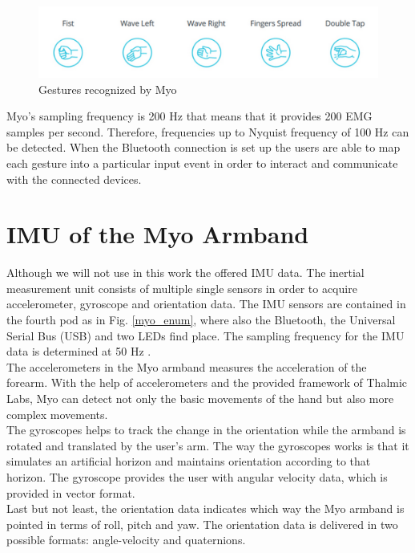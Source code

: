 \begin{figure}[H]
\includegraphics[width=15cm,left,keepaspectratio]{figures/motions}
\caption{Gestures recognized by Myo}
\label{motions}
\end{figure}
Myo's sampling frequency is 200 Hz that means that it provides 200 EMG samples per second. Therefore, frequencies up to Nyquist frequency of 100 Hz can be detected. When the Bluetooth connection is set up the users are able to map each gesture into a particular input event in order to interact and communicate with the connected devices. 

\section{IMU of the Myo Armband}
Although we will not use in this work the offered IMU data. The inertial measurement unit consists of multiple single sensors in order to acquire accelerometer, gyroscope and orientation data. The IMU sensors are contained in the fourth pod as in Fig. \ref{myo_enum}, where also the Bluetooth, the Universal Serial Bus (USB) and two LEDs find place. The sampling frequency for the IMU data is determined at 50 Hz \cite{IMU}.\\
The accelerometers in the Myo armband measures the acceleration of the forearm. With the help of accelerometers and the provided framework of Thalmic Labs, Myo can detect not only the basic movements of the hand but also more complex movements.\\
The gyroscopes helps to track the change in the orientation while the armband is rotated and translated by the user's arm. The way the gyroscopes works is that it simulates an artificial horizon and maintains orientation according to that horizon. The gyroscope provides the user with angular velocity data, which is provided in vector format. \\
Last but not least, the orientation data indicates which way the Myo armband is pointed in terms of roll, pitch and yaw. The orientation data is delivered in two possible formats: angle-velocity and quaternions.

